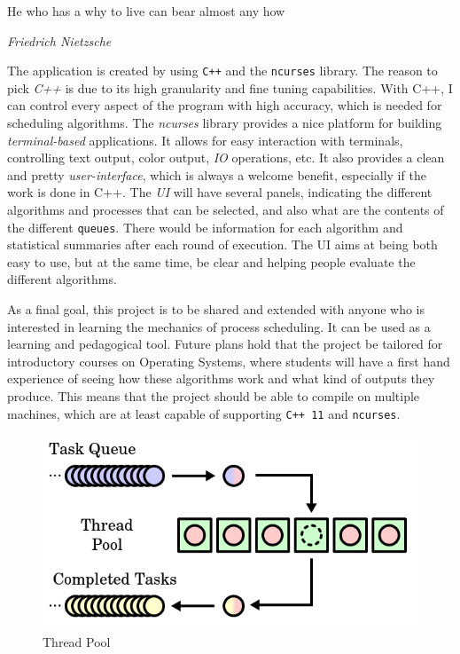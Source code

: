 \documentclass{article}
\newcommand{\code}[1]{\colorbox{codebg}{{\color{black}\texttt{#1}}}}
\begin{document}
\epigraph{He who has a why to live can bear almost any how}{\textit{Friedrich Nietzsche}}

The application is created by using \code{C++} and the \code{ncurses} library. The reason to pick \textit{C++} is due to its high granularity and fine tuning capabilities. With C++, I can control every aspect of the program with high accuracy, which is needed for scheduling algorithms. The \textit{ncurses} library provides a nice platform for building \textit{terminal-based} applications. It allows for easy interaction with terminals, controlling text output, color output, \textit{IO} operations, etc. It also provides a clean and pretty \textit{user-interface}, which is always a welcome benefit, especially if the work is done in C++. The \textit{UI} will have several panels, indicating the different algorithms and processes that can be selected, and also what are the contents of the different \code{queues}. There would be information for each algorithm and statistical summaries after each round of execution. The UI aims at being both easy to use, but at the same time, be clear and helping people evaluate the different algorithms.

As a final goal, this project is to be shared and extended with anyone who is interested in learning the mechanics of process scheduling. It can be used as a learning and pedagogical tool. Future plans hold that the project be tailored for introductory courses on Operating Systems, where students will have a first hand experience of seeing how these algorithms work and what kind of outputs they produce. This means that the project should be able to compile on multiple machines, which are at least capable of supporting \code{C++ 11} and \code{ncurses}.

\begin{figure}[H]
  \includegraphics[width=\linewidth]{./pics/thread_pool.png}
  \caption{Thread Pool}
  \label{fig:Thread Pool}
\end{figure}
\end{document}
